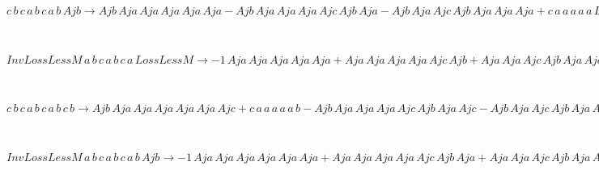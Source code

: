 \documentclass[rep10,leqno]{report}
\begin{document}
\begin{minipage}{6in}
$
c\,
 b\,
 c\,
 a\,
 b\,
 c\,
 a\,
 b\,
 Ajb\rightarrow Ajb\,
 Aja\,
 Aja\,
 Aja\,
 Aja\,
 Aja - Ajb\,
 Aja\,
 Aja\,
 Aja\,
 Ajc\,
 Ajb\,
 Aja - Ajb\,
 Aja\,
 Ajc\,
 Ajb\,
 Aja\,
 Aja\,
 Aja + c\,
 a\,
 a\,
 a\,
 a\,
 a\,
 LossLessM - c\,
 a\,
 a\,
 a\,
 a\,
 b\,
 Ajb + Ajb\,
 Aja\,
 Ajc\,
 Ajb\,
 Aja\,
 Ajc\,
 Ajb\,
 Aja - c\,
 a\,
 a\,
 b\,
 c\,
 a\,
 a\,
 LossLessM + c\,
 a\,
 a\,
 b\,
 c\,
 a\,
 b\,
 Ajb - c\,
 b\,
 c\,
 a\,
 a\,
 a\,
 a\,
 LossLessM + c\,
 b\,
 c\,
 a\,
 a\,
 a\,
 b\,
 Ajb + c\,
 b\,
 c\,
 a\,
 b\,
 c\,
 a\,
 a\,
 LossLessM
$
\end{minipage}\medskip \\
\begin{minipage}{6in}
$
InvLossLessM\,
 a\,
 b\,
 c\,
 a\,
 b\,
 c\,
 a\,
 LossLessM\rightarrow -1\,
 Aja\,
 Aja\,
 Aja\,
 Aja\,
 Aja + Aja\,
 Aja\,
 Aja\,
 Aja\,
 Ajc\,
 Ajb + Aja\,
 Aja\,
 Ajc\,
 Ajb\,
 Aja\,
 Aja + Ajc\,
 Ajb\,
 Aja\,
 Aja\,
 Aja\,
 Aja - Aja\,
 Aja\,
 Ajc\,
 Ajb\,
 Aja\,
 Ajc\,
 Ajb - Ajc\,
 Ajb\,
 Aja\,
 Aja\,
 Aja\,
 Ajc\,
 Ajb - Ajc\,
 Ajb\,
 Aja\,
 Ajc\,
 Ajb\,
 Aja\,
 Aja - InvLossLessM\,
 a\,
 a\,
 a\,
 a\,
 a\,
 LossLessM + Ajc\,
 Ajb\,
 Aja\,
 Ajc\,
 Ajb\,
 Aja\,
 Ajc\,
 Ajb + InvLossLessM\,
 a\,
 a\,
 a\,
 b\,
 c\,
 a\,
 LossLessM + InvLossLessM\,
 a\,
 b\,
 c\,
 a\,
 a\,
 a\,
 LossLessM
$
\end{minipage}\medskip \\
\begin{minipage}{6in}
$
c\,
 b\,
 c\,
 a\,
 b\,
 c\,
 a\,
 b\,
 c\,
 b\rightarrow Ajb\,
 Aja\,
 Aja\,
 Aja\,
 Aja\,
 Aja\,
 Ajc + c\,
 a\,
 a\,
 a\,
 a\,
 a\,
 b - Ajb\,
 Aja\,
 Aja\,
 Aja\,
 Ajc\,
 Ajb\,
 Aja\,
 Ajc - Ajb\,
 Aja\,
 Ajc\,
 Ajb\,
 Aja\,
 Aja\,
 Aja\,
 Ajc - c\,
 a\,
 a\,
 a\,
 a\,
 b\,
 c\,
 b - c\,
 a\,
 a\,
 b\,
 c\,
 a\,
 a\,
 b - c\,
 b\,
 c\,
 a\,
 a\,
 a\,
 a\,
 b + Ajb\,
 Aja\,
 Ajc\,
 Ajb\,
 Aja\,
 Ajc\,
 Ajb\,
 Aja\,
 Ajc + c\,
 a\,
 a\,
 b\,
 c\,
 a\,
 b\,
 c\,
 b + c\,
 b\,
 c\,
 a\,
 a\,
 a\,
 b\,
 c\,
 b + c\,
 b\,
 c\,
 a\,
 b\,
 c\,
 a\,
 a\,
 b
$
\end{minipage}\medskip \\
\begin{minipage}{6in}
$
InvLossLessM\,
 a\,
 b\,
 c\,
 a\,
 b\,
 c\,
 a\,
 b\,
 Ajb\rightarrow -1\,
 Aja\,
 Aja\,
 Aja\,
 Aja\,
 Aja\,
 Aja + Aja\,
 Aja\,
 Aja\,
 Aja\,
 Ajc\,
 Ajb\,
 Aja + Aja\,
 Aja\,
 Ajc\,
 Ajb\,
 Aja\,
 Aja\,
 Aja + Ajc\,
 Ajb\,
 Aja\,
 Aja\,
 Aja\,
 Aja\,
 Aja - Aja\,
 Aja\,
 Ajc\,
 Ajb\,
 Aja\,
 Ajc\,
 Ajb\,
 Aja - Ajc\,
 Ajb\,
 Aja\,
 Aja\,
 Aja\,
 Ajc\,
 Ajb\,
 Aja - Ajc\,
 Ajb\,
 Aja\,
 Ajc\,
 Ajb\,
 Aja\,
 Aja\,
 Aja + InvLossLessM\,
 a\,
 a\,
 a\,
 a\,
 a\,
 a\,
 LossLessM - InvLossLessM\,
 a\,
 a\,
 a\,
 a\,
 a\,
 b\,
 Ajb + Ajc\,
 Ajb\,
 Aja\,
 Ajc\,
 Ajb\,
 Aja\,
 Ajc\,
 Ajb\,
 Aja - InvLossLessM\,
 a\,
 a\,
 a\,
 b\,
 c\,
 a\,
 a\,
 LossLessM + InvLossLessM\,
 a\,
 a\,
 a\,
 b\,
 c\,
 a\,
 b\,
 Ajb - InvLossLessM\,
 a\,
 b\,
 c\,
 a\,
 a\,
 a\,
 a\,
 LossLessM + InvLossLessM\,
 a\,
 b\,
 c\,
 a\,
 a\,
 a\,
 b\,
 Ajb + InvLossLessM\,
 a\,
 b\,
 c\,
 a\,
 b\,
 c\,
 a\,
 a\,
 LossLessM
$
\end{minipage}\medskip \\
\end{document}
